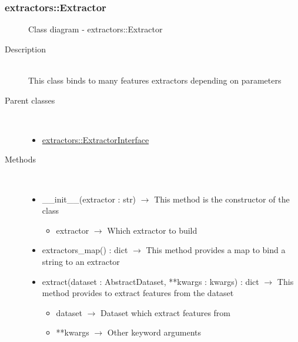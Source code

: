 \subsubsection[Extractor]{extractors::Extractor}
\begin{figure}[h]
\centering
{}
\caption{Class diagram - extractors::Extractor}
\end{figure}\begin{description}
\item[Description] \hfill \\
 This class binds to many features extractors depending on parameters
\item[Parent classes] \hfill \\
 \vspace{-1cm}
\begin{itemize}
\item \hyperlink{extractors::ExtractorInterface}{extractors::ExtractorInterface}
\end{itemize}

\item[Methods] \hfill \\
 \vspace{-1cm}
\begin{itemize}
\item \_\_init\_\_(extractor : str) $\rightarrow$ This method is the constructor of the class\begin{itemize}
\item extractor $\rightarrow$ Which extractor to build
\end{itemize}

\item extractors\_map() : dict $\rightarrow$ This method provides a map to bind a string to an extractor
\item extract(dataset : AbstractDataset, **kwargs : kwargs) : dict $\rightarrow$ This method provides to extract features from the dataset\begin{itemize}
\item dataset $\rightarrow$ Dataset which extract features from
\item **kwargs $\rightarrow$ Other keyword arguments
\end{itemize}

\end{itemize}

\end{description}
